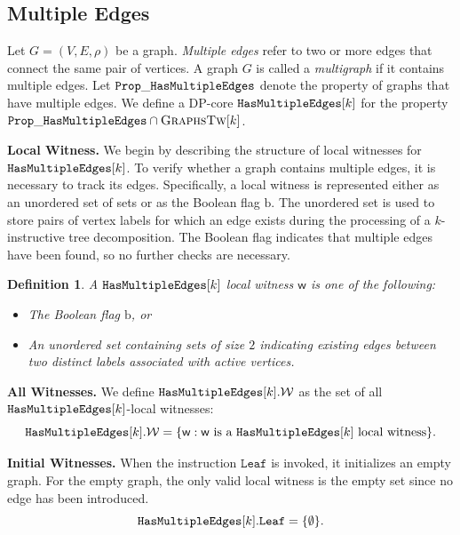 \documentclass[11pt,a4paper]{article}
\newtheorem{definition}[theorem]{Definition}
\newcommand{\treewidthvalue}{k}
\newcommand{\agraph}{G}
\newcommand{\incidencerelationname}{\rho}
\newcommand{\initialsetgeneric}{\mathtt{Leaf}}
\newcommand{\initialsetgenericcore}{\mathtt{Leaf}}
\newcommand{\allwitnesses}{\mathcal{W}}
\newcommand{\awitness}{\mathsf{w}}
\newcommand{\dpcore}{\mathsf{D}}
\newcommand{\allgraphstreewidth}[1]{\textsc{GraphsTw}[#1]}
\newcommand{\dpNamePart}[1]{\mbox{\normalfont\ttfamily #1}}
\newcommand{\hasMultiEdgeProperty}{\dpNamePart{Prop}\_\allowbreak\dpNamePart{HasMultipleEdges}}
\newcommand{\hasMultiEdgeCore}{\dpNamePart{HasMultipleEdges}}
\newcommand{\vertexsetname}{V}
\newcommand{\edgesetname}{E}
\newcommand{\multiedgefound}{\mathrm{b}}
\begin{document}
\subsection{Multiple Edges}
{
	\renewcommand{\dpcore}{\hasMultiEdgeCore}

	Let \(\agraph=(\vertexsetname,\edgesetname,\incidencerelationname)\) be a graph. \emph{Multiple edges} refer to two or more edges that connect the same pair of vertices. A graph \(\agraph\) is called a \emph{multigraph} if it contains multiple edges. Let \(\hasMultiEdgeProperty\) denote the property of graphs that have multiple edges. We define a DP-core \(\hasMultiEdgeCore[\treewidthvalue]\) for the property \(\hasMultiEdgeProperty \cap \allgraphstreewidth{\treewidthvalue}\).

	\noindent\textbf{Local Witness.}
	We begin by describing the structure of local witnesses for \(\dpcore[\treewidthvalue]\). To verify whether a graph contains multiple edges, it is necessary to track its edges. Specifically, a local witness is represented either as an unordered set of sets or as the Boolean flag \(\multiedgefound\). The unordered set is used to store pairs of vertex labels for which an edge exists during the processing of a \(\treewidthvalue\)-instructive tree decomposition. The Boolean flag indicates that multiple edges have been found, so no further checks are necessary.

	\begin{definition}
	A \(\dpcore[\treewidthvalue]\) local witness \(\awitness\) is one of the following:

	\begin{itemize}
		\item The Boolean flag \(\multiedgefound\), or
		\item An unordered set containing sets of size \(2\) indicating existing edges between two distinct labels associated with active vertices.
	\end{itemize}
	\end{definition}

	\noindent\textbf{All Witnesses.}
	We define \(\dpcore[\treewidthvalue].\allwitnesses\) as the set of all \(\dpcore[\treewidthvalue]\)-local witnesses:
	\[
	\dpcore[\treewidthvalue].\allwitnesses = \{\awitness : \awitness \text{ is a } \dpcore[\treewidthvalue] \text{ local witness}\}.
	\]

	\noindent\textbf{Initial Witnesses.}
	When the instruction \(\initialsetgenericcore\) is invoked, it initializes an empty graph. For the empty graph, the only valid local witness is the empty set since no edge has been introduced.
	\[
	\dpcore[\treewidthvalue].\initialsetgeneric = \{\emptyset\}.
	\]

}
\end{document}
